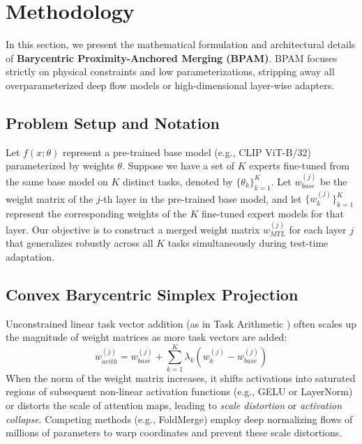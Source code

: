 \section{Methodology}
\label{sec:method}

In this section, we present the mathematical formulation and architectural details of {\bf Barycentric Proximity-Anchored Merging (BPAM)}. BPAM focuses strictly on physical constraints and low parameterizations, stripping away all overparameterized deep flow models or high-dimensional layer-wise adapters.

\subsection{Problem Setup and Notation}
Let $f(x; \theta)$ represent a pre-trained base model (e.g., CLIP ViT-B/32) parameterized by weights $\theta$. Suppose we have a set of $K$ experts fine-tuned from the same base model on $K$ distinct tasks, denoted by $\{\theta_k\}_{k=1}^K$. Let $w_{base}^{(j)}$ be the weight matrix of the $j$-th layer in the pre-trained base model, and let $\{w_k^{(j)}\}_{k=1}^K$ represent the corresponding weights of the $K$ fine-tuned expert models for that layer. Our objective is to construct a merged weight matrix $w_{MTL}^{(j)}$ for each layer $j$ that generalizes robustly across all $K$ tasks simultaneously during test-time adaptation.

\subsection{Convex Barycentric Simplex Projection}
Unconstrained linear task vector addition (as in Task Arithmetic \cite{ilharco2022editing}) often scales up the magnitude of weight matrices as more task vectors are added:
\begin{equation}
    w_{arith}^{(j)} = w_{base}^{(j)} + \sum_{k=1}^K \lambda_k (w_k^{(j)} - w_{base}^{(j)})
\end{equation}
When the norm of the weight matrix increases, it shifts activations into saturated regions of subsequent non-linear activation functions (e.g., GELU or LayerNorm) or distorts the scale of attention maps, leading to {\it scale distortion} or {\it activation collapse}. Competing methods (e.g., FoldMerge) employ deep normalizing flows of millions of parameters to warp coordinates and prevent these scale distortions.

